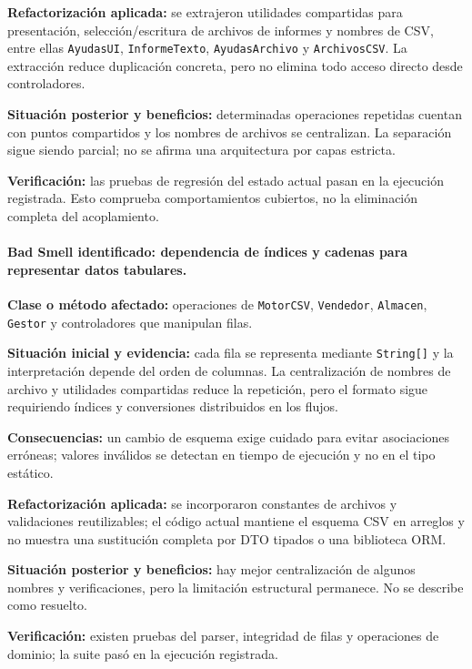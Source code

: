 \textbf{Refactorización aplicada:} se extrajeron utilidades compartidas para presentación, selección/escritura de archivos de informes y nombres de CSV, entre ellas \texttt{AyudasUI}, \texttt{InformeTexto}, \texttt{AyudasArchivo} y \texttt{ArchivosCSV}. La extracción reduce duplicación concreta, pero no elimina todo acceso directo desde controladores.

\textbf{Situación posterior y beneficios:} determinadas operaciones repetidas cuentan con puntos compartidos y los nombres de archivos se centralizan. La separación sigue siendo parcial; no se afirma una arquitectura por capas estricta.

\textbf{Verificación:} las pruebas de regresión del estado actual pasan en la ejecución registrada. Esto comprueba comportamientos cubiertos, no la eliminación completa del acoplamiento.

\paragraph{Bad Smell identificado: dependencia de índices y cadenas para representar datos tabulares.}
\textbf{Clase o método afectado:} operaciones de \texttt{MotorCSV}, \texttt{Vendedor}, \texttt{Almacen}, \texttt{Gestor} y controladores que manipulan filas.

\textbf{Situación inicial y evidencia:} cada fila se representa mediante \texttt{String[]} y la interpretación depende del orden de columnas. La centralización de nombres de archivo y utilidades compartidas reduce la repetición, pero el formato sigue requiriendo índices y conversiones distribuidos en los flujos.

\textbf{Consecuencias:} un cambio de esquema exige cuidado para evitar asociaciones erróneas; valores inválidos se detectan en tiempo de ejecución y no en el tipo estático.

\textbf{Refactorización aplicada:} se incorporaron constantes de archivos y validaciones reutilizables; el código actual mantiene el esquema CSV en arreglos y no muestra una sustitución completa por DTO tipados o una biblioteca ORM.

\textbf{Situación posterior y beneficios:} hay mejor centralización de algunos nombres y verificaciones, pero la limitación estructural permanece. No se describe como resuelto.

\textbf{Verificación:} existen pruebas del parser, integridad de filas y operaciones de dominio; la suite pasó en la ejecución registrada.

